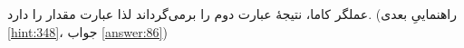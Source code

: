 \section{}
\paragraph{}\label{hint:17}
عملگر کاما، نتیجهٔ عبارت دوم را برمی‌گرداند لذا عبارت  مقدار  را دارد. (راهنماییِ بعدی \ref{hint:348}، جواب \ref{answer:86})